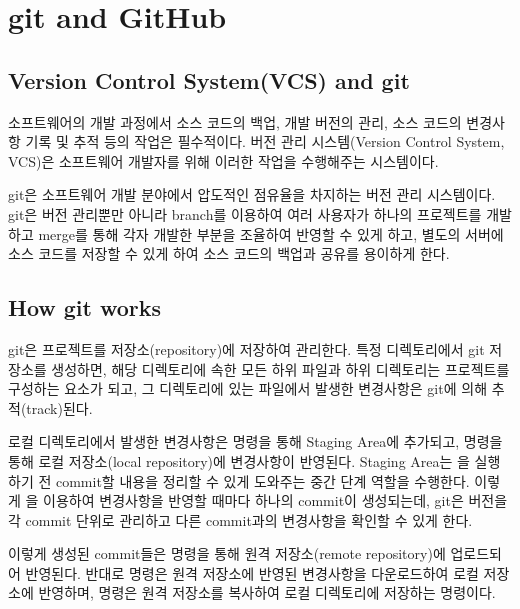 \section{git and GitHub}\label{sect:git-and-github}

\subsection*{Version Control System(VCS) and git}

소프트웨어의 개발 과정에서 소스 코드의 백업, 개발 버전의 관리, 소스 코드의 변경사항 기록 및 추적 등의 작업은 필수적이다. 버전 관리 시스템(Version Control System, VCS)은 소프트웨어 개발자를 위해 이러한 작업을 수행해주는 시스템이다.

git은 소프트웨어 개발 분야에서 압도적인 점유율을 차지하는 버전 관리 시스템이다. git은 버전 관리뿐만 아니라 branch를 이용하여 여러 사용자가 하나의 프로젝트를 개발하고 merge를 통해 각자 개발한 부분을 조율하여 반영할 수 있게 하고, 별도의 서버에 소스 코드를 저장할 수 있게 하여 소스 코드의 백업과 공유를 용이하게 한다.

\subsection*{How git works}

git은 프로젝트를 저장소(repository)에 저장하여 관리한다. 특정 디렉토리에서 git 저장소를 생성하면, 해당 디렉토리에 속한 모든 하위 파일과 하위 디렉토리는 프로젝트를 구성하는 요소가 되고, 그 디렉토리에 있는 파일에서 발생한 변경사항은 git에 의해 추적(track)된다.

로컬 디렉토리에서 발생한 변경사항은  명령을 통해 Staging Area에 추가되고,  명령을 통해 로컬 저장소(local repository)에 변경사항이 반영된다. Staging Area는 을 실행하기 전 commit할 내용을 정리할 수 있게 도와주는 중간 단계 역할을 수행한다. 이렇게 을 이용하여 변경사항을 반영할 때마다 하나의 commit이 생성되는데, git은 버전을 각 commit 단위로 관리하고 다른 commit과의 변경사항을 확인할 수 있게 한다.

이렇게 생성된 commit들은  명령을 통해 원격 저장소(remote repository)에 업로드되어 반영된다. 반대로  명령은 원격 저장소에 반영된 변경사항을 다운로드하여 로컬 저장소에 반영하며,  명령은 원격 저장소를 복사하여 로컬 디렉토리에 저장하는 명령이다.


